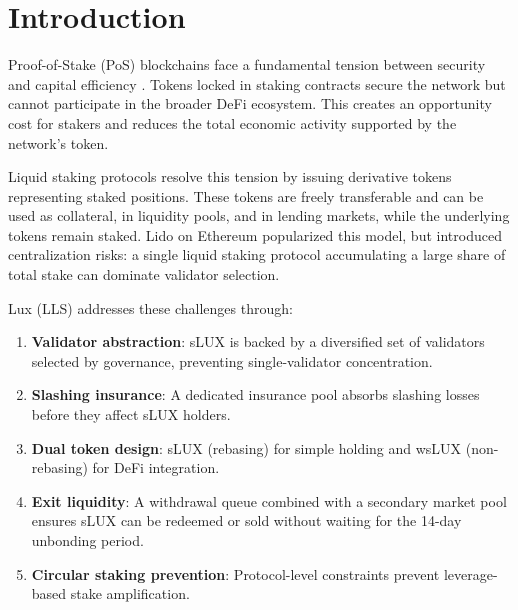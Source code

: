\section{Introduction}


Proof-of-Stake (PoS) blockchains face a fundamental tension between security and capital efficiency \cite{saleh2021blockchain}. Tokens locked in staking contracts secure the network but cannot participate in the broader DeFi ecosystem. This creates an opportunity cost for stakers and reduces the total economic activity supported by the network's token.

Liquid staking protocols resolve this tension by issuing derivative tokens representing staked positions. These tokens are freely transferable and can be used as collateral, in liquidity pools, and in lending markets, while the underlying tokens remain staked. Lido on Ethereum \cite{lidofinance} popularized this model, but introduced centralization risks: a single liquid staking protocol accumulating a large share of total stake can dominate validator selection.

Lux  (LLS) addresses these challenges through:

\begin{enumerate}[label=(\roman*)]
    \item \textbf{Validator abstraction}: sLUX is backed by a diversified set of validators selected by governance, preventing single-validator concentration.
    \item \textbf{Slashing insurance}: A dedicated insurance pool absorbs slashing losses before they affect sLUX holders.
    \item \textbf{Dual token design}: sLUX (rebasing) for simple holding and wsLUX (non-rebasing) for DeFi integration.
    \item \textbf{Exit liquidity}: A withdrawal queue combined with a secondary market pool ensures sLUX can be redeemed or sold without waiting for the 14-day unbonding period.
    \item \textbf{Circular staking prevention}: Protocol-level constraints prevent leverage-based stake amplification.
\end{enumerate}

